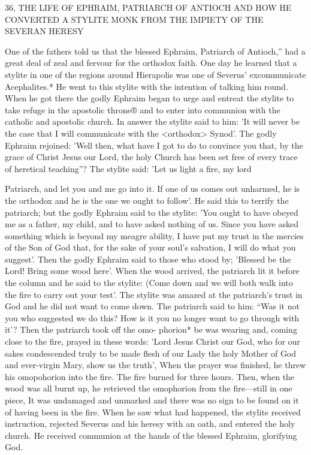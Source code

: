 36, THE LIFE OF EPHRAIM, PATRIARCH OF ANTIOCH
AND HOW HE CONVERTED A STYLITE MONK FROM
THE IMPIETY OF THE SEVERAN HERESY

One of the fathers told us that the blessed Ephraim, Patriarch of
Antioch,” had a great deal of zeal and fervour for the orthodox
faith.
One day he learned that a stylite in one of the regions around
Hierapolis was one of Severus' excommunicate Acephalites.* He
went to this stylite with the intention of talking him round.
When
he got there the godly Ephraim began to urge and entreat the stylite
to take refuge in the apostolic throne® and to enter into communion
with the catholic and apostolic church.
In answer the stylite said to
him: 'It will never be the case that I will communicate with the
<orthodox> Synod'.
The godly Ephraim rejoined: 'Well then, what
have I got to do to convince you that, by the grace of Christ Jesus
our Lord, the holy Church has been set free of every trace of
heretical teaching”? The stylite said: 'Let us light a fire, my lord

Patriarch, and let you and me go into it.
If one of us comes out
unharmed, he is the orthodox and he is the one we ought to follow'.
He said this to terrify the patriarch; but the godly Ephraim said to
the stylite: 'You ought to have obeyed me as a father, my child, and
to have asked nothing of us.
Since you have asked something which
is beyond my meagre ability, I have put my trust in the mercies of
the Son of God that, for the sake of your soul's salvation, I will do
what you suggest'.
Then the godly Ephraim said to those who stood
by; 'Blessed be the Lord! Bring some wood here'.
When the wood
arrived, the patriarch lit it before the column and he said to the
stylite: (Come down and we will both walk into the fire to carry out
your test'.
The stylite was amazed at the patriarch's trust in God
and he did not want to come down.
The patriarch said to him: “Was
it not you who suggested we do this? How is it you no longer want
to go through with it'? Then the patriarch took off the omo-
phorion* be was wearing and, coming close to the fire, prayed in
these words: 'Lord Jesus Christ our God, who for our sakes
condescended truly to be made flesh of our Lady the holy Mother
of God and ever-virgin Mary, show us the truth', When the prayer
was finished, he threw his omopohorion into the fire.
The fire
burned for three hours.
Then, when the wood was all burnt up, he
retrieved the omophorion from the fire—still in one piece, It was
undamaged and unmarked and there was no sign to be found on it
of having been in the fire.
When he saw what had happened, the
stylite received instruction, rejected Severus and his heresy with an
oath, and entered the holy church.
He received communion at the
hands of the blessed Ephraim, glorifying God.

